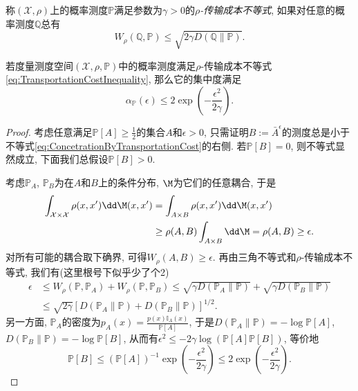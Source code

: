  称$(\mathcal{X}, \rho)$上的概率测度$\mathbb{P}$满足参数为$\gamma > 0$的\emph{$\rho$-传输成本不等式}, 如果对任意的概率测度$\mathbb{Q}$总有
 \begin{equation}\label{eq:TransportationCostInequality}
 	W_{\rho} (\mathbb{Q}, \mathbb{P}) \leq \sqrt{2 \gamma D(\mathbb{Q} \| \mathbb{P})}.
 \end{equation}

\begin{theorem}
	若度量测度空间$(\mathcal{X}, \rho, \mathbb{P})$中的概率测度满足$\rho$-传输成本不等式\eqref{eq:TransportationCostInequality}, 那么它的集中度满足
	\begin{equation}\label{eq:ConcetrationByTransportationCost}
		\alpha_{\mathbb{P}}(\epsilon) \leq 2 \exp \left(- \frac{\epsilon^2}{2 \gamma} \right).
	\end{equation}
\end{theorem}
\begin{proof}
	考虑任意满足$\mathbb{P}[A] \geq \frac12$的集合$A$和$\epsilon > 0$, 只需证明$B := \bar A^{\epsilon}$的测度总是小于不等式\eqref{eq:ConcetrationByTransportationCost}的右侧. 
	若$\mathbb{P}[B] = 0$, 则不等式显然成立, 下面我们总假设$\mathbb{P}[B] > 0$. 
	
	考虑$\mathbb{P}_A$, $\mathbb{P}_B$为在$A$和$B$上的条件分布, $\M$为它们的任意耦合, 于是
	\begin{align*}
		\int_{\mathcal{X} \times \mathcal{X}} \rho(x, x') \dd \M(x, x')
		&= \int_{A \times B} \rho(x, x') \dd \M(x, x') \\
		&\geq \rho(A, B) \int_{A \times B} \dd \M 
		= \rho(A, B) 
		\geq \epsilon. 
	\end{align*}
	对所有可能的耦合取下确界, 可得$W_{\rho}(A, B) \geq \epsilon$. 
	再由三角不等式和$\rho$-传输成本不等式, 我们有(这里根号下似乎少了个2)
	\begin{align*}
		\epsilon 
		&\leq W_{\rho}(\mathbb{P}, \mathbb{P}_A) + W_{\rho}(\mathbb{P}, \mathbb{P}_B) 
		\leq \sqrt{\gamma D(\mathbb{P}_A \| \mathbb{P})} + \sqrt{\gamma D(\mathbb{P}_B \| \mathbb{P})} \\
		&\leq \sqrt{2 \gamma} \left[ D(\mathbb{P}_A \| \mathbb{P}) + D(\mathbb{P}_B \| \mathbb{P}) \right]^{1/2}.
	\end{align*}
	另一方面, $\mathbb{P}_A$的密度为$p_A(x) = \frac{p(x) \mathbb I_A(x)}{\mathbb{P}[A]}$, 于是$D(\mathbb{P}_A \| \mathbb{P}) = - \log \mathbb{P}[A]$, $D(\mathbb{P}_B \| \mathbb{P}) = -\log \mathbb{P}[B]$, 从而有$\epsilon^2 \leq -  2 \gamma \log (\mathbb{P}[A] \mathbb{P}[B])$, 等价地
	\begin{equation*}
		 \mathbb{P}[B] 
		 \leq (\mathbb{P}[A])^{-1} \exp\left(- \frac{\epsilon^2}{2 \gamma} \right) 
		 \leq 2 \exp\left(- \frac{\epsilon^2}{2 \gamma} \right). 
	\end{equation*}
\end{proof}



